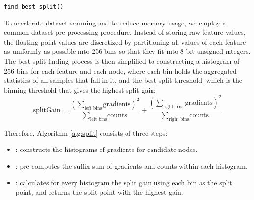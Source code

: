 \begin{algorithm}[ht]
 \SetAlgoLined
 \caption{\texttt{find\_best\_split()}}
 \label{alg:split}
\end{algorithm}

To accelerate dataset scanning and to reduce memory usage, we employ a common dataset pre-processing procedure. Instead of storing raw feature values, the floating point values are discretized by partitioning all values of each feature as uniformly as possible into 256 bins  so that they fit into 8-bit unsigned integers. The best-split-finding process is then simplified to constructing a histogram of 256 bins for each feature and each node, where each bin holds the aggregated statistics of all samples that fall in it, and the best split threshold, which is the binning threshold that gives the highest split gain:
\begin{equation*}
\text{splitGain} = \frac{(\sum_\text{left bins}\text{gradients})^2}{\sum_\text{left bins}\text{counts}}+\frac{(\sum_\text{right bins}\text{gradients})^2}{\sum_\text{right bins}\text{counts}}
\end{equation*}

Therefore, Algorithm \ref{alg:split} consists of three steps: 
\begin{itemize}[noitemsep, leftmargin=*]
    \item \update: constructs the histograms of gradients for candidate nodes.
    \item \cumulate: pre-computes the suffix-sum of gradients and counts within each histogram. 
    \item \getbestsplit: calculates for every histogram the split gain using each bin as the split point, and returns the split point with the highest gain.
\end{itemize}

